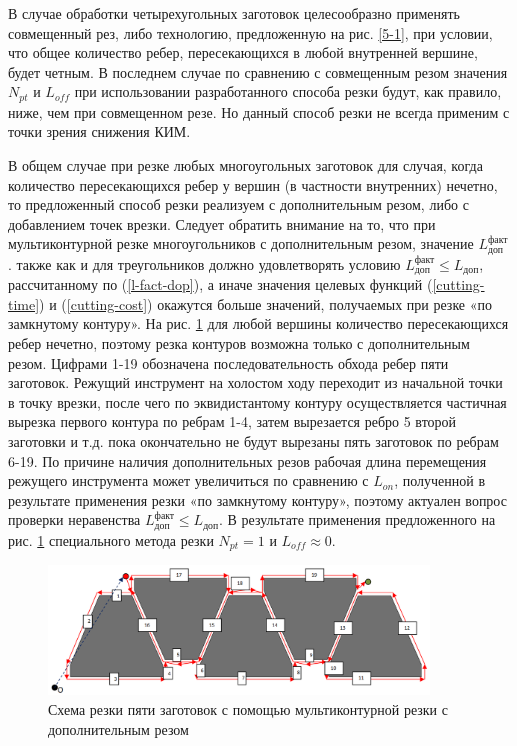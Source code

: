 \documentclass[12pt]{report}
\begin{document}
В случае обработки четырехугольных заготовок
целесообразно применять совмещенный рез,
либо технологию, предложенную на рис. \ref{5-1},
при условии, что общее количество ребер,
пересекающихся в любой внутренней вершине, будет четным.
В последнем случае по сравнению с совмещенным резом значения
$N_{pt}$
и $L_{off}$
при использовании разработанного способа резки будут,
как правило, ниже, чем при совмещенном резе.
Но данный способ резки не всегда применим
с точки зрения снижения КИМ.

В общем случае при резке любых многоугольных
заготовок для случая,
когда количество пересекающихся ребер у вершин
(в частности внутренних) нечетно,
то предложенный способ резки реализуем с
дополнительным резом, либо с добавлением точек врезки.
Следует обратить внимание на то,
что при мультиконтурной резке многоугольников с
дополнительным резом, значение
$L_\text{доп}^\text{факт}$.
также как и для треугольников должно удовлетворять условию
$L_\text{доп}^\text{факт} \leqslant L_\text{доп}$,
рассчитанному по (\ref{l-fact-dop}),
а иначе значения целевых функций (\ref{cutting-time})
и (\ref{cutting-cost})
окажутся больше значений,
получаемых  при резке «по замкнутому контуру».
На рис. \ref{5-extra}
для любой вершины количество пересекающихся ребер нечетно,
поэтому резка контуров возможна только с дополнительным резом.
Цифрами 1-19 обозначена последовательность обхода ребер
пяти заготовок.
Режущий инструмент на холостом ходу переходит
из начальной точки в точку врезки,
после чего по эквидистантому контуру
осуществляется частичная вырезка первого
контура по ребрам 1-4,
затем вырезается ребро 5 второй заготовки и т.д.
пока окончательно не будут вырезаны пять заготовок по ребрам 6-19.
По причине наличия дополнительных резов рабочая
длина перемещения режущего инструмента может увеличиться по сравнению с $L_{on}$,
полученной в результате применения резки «по замкнутому контуру»,
поэтому актуален вопрос проверки неравенства
$L_\text{доп}^\text{факт} \leqslant L_\text{доп}$.
В результате применения предложенного на рис. \ref{5-extra}
специального метода резки
$N_{pt}=1$
и $L_{off} \approx 0$.

\begin{figure}
  \begin{center}
  \includegraphics[width=0.9\textwidth]{5-extra.png}
  \caption{Схема резки пяти заготовок с помощью мультиконтурной резки с дополнительным резом}
  \label{5-extra}
  \end{center}
\end{figure}
\end{document}
